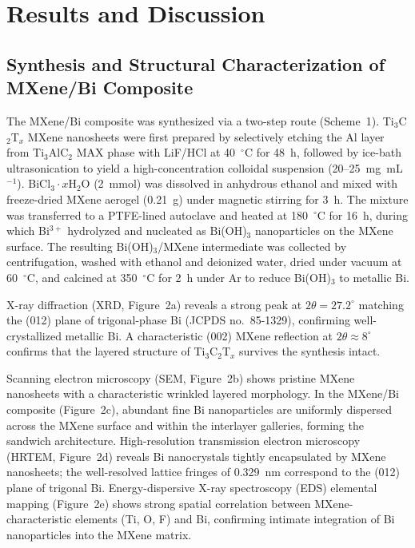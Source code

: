 \section{Results and Discussion}

\subsection{Synthesis and Structural Characterization of MXene/Bi Composite}

The MXene/Bi composite was synthesized via a two-step route (Scheme~1). Ti$_{3}$C$_{2}$T$_{x}$ MXene nanosheets were first prepared by selectively etching the Al layer from Ti$_{3}$AlC$_{2}$ MAX phase with LiF/HCl at 40~$^{\circ}$C for 48~h, followed by ice-bath ultrasonication to yield a high-concentration colloidal suspension (20--25~mg~mL$^{-1}$). BiCl$_{3}\cdot x$H$_{2}$O (2~mmol) was dissolved in anhydrous ethanol and mixed with freeze-dried MXene aerogel (0.21~g) under magnetic stirring for 3~h. The mixture was transferred to a PTFE-lined autoclave and heated at 180~$^{\circ}$C for 16~h, during which Bi$^{3+}$ hydrolyzed and nucleated as Bi(OH)$_{3}$ nanoparticles on the MXene surface. The resulting Bi(OH)$_{3}$/MXene intermediate was collected by centrifugation, washed with ethanol and deionized water, dried under vacuum at 60~$^{\circ}$C, and calcined at 350~$^{\circ}$C for 2~h under Ar to reduce Bi(OH)$_{3}$ to metallic Bi.

X-ray diffraction (XRD, Figure~2a) reveals a strong peak at $2\theta = 27.2^{\circ}$ matching the (012) plane of trigonal-phase Bi (JCPDS no.\ 85-1329), confirming well-crystallized metallic Bi. A characteristic (002) MXene reflection at $2\theta \approx 8^{\circ}$ confirms that the layered structure of Ti$_{3}$C$_{2}$T$_{x}$ survives the synthesis intact.

Scanning electron microscopy (SEM, Figure~2b) shows pristine MXene nanosheets with a characteristic wrinkled layered morphology. In the MXene/Bi composite (Figure~2c), abundant fine Bi nanoparticles are uniformly dispersed across the MXene surface and within the interlayer galleries, forming the sandwich architecture. High-resolution transmission electron microscopy (HRTEM, Figure~2d) reveals Bi nanocrystals tightly encapsulated by MXene nanosheets; the well-resolved lattice fringes of 0.329~nm correspond to the (012) plane of trigonal Bi. Energy-dispersive X-ray spectroscopy (EDS) elemental mapping (Figure~2e) shows strong spatial correlation between MXene-characteristic elements (Ti, O, F) and Bi, confirming intimate integration of Bi nanoparticles into the MXene matrix.

